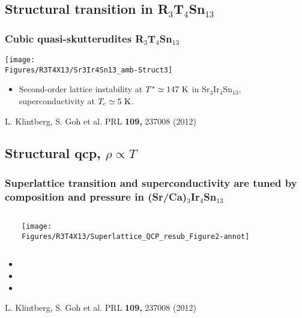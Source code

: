 \subsection{Structural transition in R$_3$T$_4$Sn$_{13}$}
\begin{frame}[label=CIS-1]
\frametitle{Cubic quasi-skutterudites R$_3$T$_4$Sn$_{13}$}

\centerline{\texttt{[image: \\Figures/R3T4X13/Sr3Ir4Sn13\_amb-Struct3]}}
\begin{itemize}
\item
Second-order lattice instability at $T^* \simeq 147~\rm K$ in
Sr$_3$Ir$_4$Sn$_{13}$, superconductivity at $T_c \simeq 5~\rm K$.

\end{itemize}
\vspace*{\fill}
\centerline{\makebox[\linewidth]{\rule{0.85\textwidth}{0.4pt}}}
\centerline{\scriptsize L. Klintberg, S. Goh et al. PRL  {\bf 109,} 237008 (2012)}
\end{frame}




\subsection{Structural qcp, $\rho \propto T$}
\begin{frame}[label=CIS-2]
\frametitle{Superlattice transition and superconductivity are tuned by
  composition and pressure in (Sr/Ca)$_3$Ir$_4$Sn$_{13}$}
\begin{columns}[t]
\vspace{-1.25em}
\centerline{~}
\centerline{\texttt{[image: \\Figures/R3T4X13/Superlattice\_QCP\_resub\_Figure2-annot]}}
\centerline{~}
\end{columns}

\begin{itemize}
\item
{}
\item
{}
\item
{}
\end{itemize}

\vspace*{\fill}
\centerline{\makebox[\linewidth]{\rule{0.85\textwidth}{0.4pt}}}
\centerline{\scriptsize L. Klintberg, S. Goh et al. PRL  {\bf 109,} 237008 (2012)}
\end{frame}

